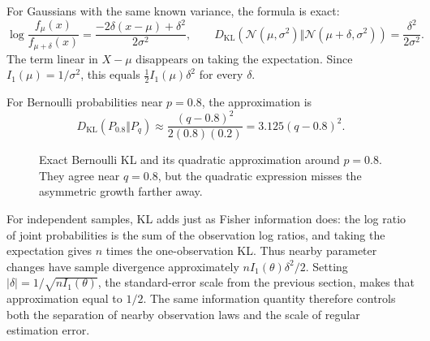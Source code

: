 For Gaussians with the same known variance, the formula is exact:
\[
  \log\frac{f_\mu(x)}{f_{\mu+\delta}(x)}
    =\frac{-2\delta(x-\mu)+\delta^2}{2\sigma^2},
  \qquad
  D_{\mathrm{KL}}\!\left(
    \mathcal N(\mu,\sigma^2)\Vert\mathcal N(\mu+\delta,\sigma^2)\right)
    =\frac{\delta^2}{2\sigma^2}.
\]
The term linear in \(X-\mu\) disappears on taking the expectation.
Since \(I_1(\mu)=1/\sigma^2\), this equals
\(\tfrac12 I_1(\mu)\delta^2\) for every \(\delta\).

For Bernoulli probabilities near \(p=0.8\), the approximation is
\[
  D_{\mathrm{KL}}(P_{0.8}\Vert P_q)
  \approx\frac{(q-0.8)^2}{2(0.8)(0.2)}
  =3.125(q-0.8)^2.
\]
\begin{figure}[H]
  \centering\InfoLocalKLPlot
  \caption{Exact Bernoulli KL and its quadratic approximation around
  \(p=0.8\). They agree near \(q=0.8\), but the quadratic expression
  misses the asymmetric growth farther away.}
  \label{fig:local-kl-information}
\end{figure}

For independent samples, KL adds just as Fisher information does:
the log ratio of joint probabilities is the sum of the observation
log ratios, and taking the expectation gives \(n\) times the
one-observation KL. Thus nearby parameter changes have sample
divergence approximately \(nI_1(\theta)\delta^2/2\).
Setting \(|\delta|=1/\sqrt{nI_1(\theta)}\), the standard-error scale
from the previous section, makes that approximation equal to \(1/2\).
The same information quantity therefore controls both the separation
of nearby observation laws and the scale of regular estimation error.

\endgroup
